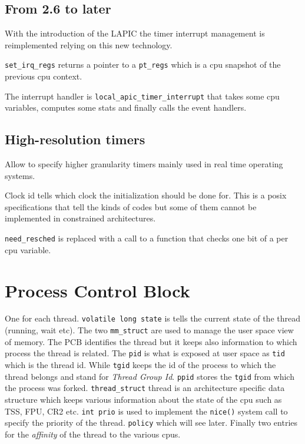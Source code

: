 \documentclass[twoside]{article}
\begin{document}
\subsection{From 2.6 to later}
\label{sub:From 2.6 to later}

With the introduction of the LAPIC the timer interrupt management is
reimplemented relying on this new technology.

\texttt{set_irq_regs} returns a pointer to a \texttt{pt_regs} which is a cpu
snapshot of the previous cpu context.

The interrupt handler is \texttt{local_apic_timer_interrupt} that takes some cpu
variables, computes some stats and finally calls the event handlers.

\subsection{High-resolution timers}
\label{sub:High-resolution timers}

Allow to specify higher granularity timers mainly used in real time operating
systems.

Clock id tells which clock the initialization should be done for. This is a
posix specifications that tell the kinds of codes but some of them cannot be
implemented in constrained architectures.


\texttt{need_resched} is replaced with a call to a function that checks one bit
of a per cpu variable.


\section{Process Control Block}
\label{sec:Process Control Block}

One for each thread. \texttt{volatile long state} is tells the current state of
the thread (running, wait etc). The two \texttt{mm_struct} are used to manage
the user space view of memory. The PCB identifies the thread but it keeps also
information to which process the thread is related. The \texttt{pid} is what is
exposed at user space as \texttt{tid} which is the thread id. While
\texttt{tgid} keeps the id of the process to which the thread belongs and stand
for \textit{Thread Group Id}. \texttt{ppid} stores the \texttt{tgid} from which
the process was forked. \texttt{thread_struct} thread is an architecture
specific data structure which keeps various information about the state of the
cpu such as TSS, FPU, CR2 etc. \texttt{int prio} is used to implement the
\texttt{nice()} system call to specify the priority of the thread.
\texttt{policy} which will see later. Finally two entries for the
\textit{affinity} of the thread to the various cpus.
\end{document}
